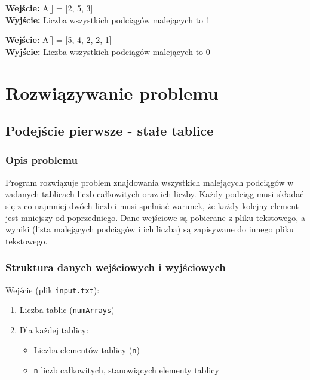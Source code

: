 \documentclass[a4paper,12pt]{article}
\begin{document}
\begin{flushleft}
\textbf{Wejście:} A[] = [2, 5, 3] \\
\textbf{Wyjście:} Liczba wszystkich podciągów malejących to 1 \\
\text{[5, 3]}
\end{flushleft}

\begin{flushleft}
\textbf{Wejście:} A[] = [5, 4, 2, 2, 1] \\
\textbf{Wyjście:} Liczba wszystkich podciągów malejących to 0
\end{flushleft}


\section{Rozwiązywanie problemu}
\subsection{Podejście pierwsze - stałe tablice}

\subsubsection{Opis problemu}

Program rozwiązuje problem znajdowania wszystkich malejących podciągów w zadanych tablicach liczb całkowitych oraz ich liczby. Każdy podciąg musi składać się z co najmniej dwóch liczb i musi spełniać warunek, że każdy kolejny element jest mniejszy od poprzedniego. Dane wejściowe są pobierane z pliku tekstowego, a wyniki (lista malejących podciągów i ich liczba) są zapisywane do innego pliku tekstowego.

\subsubsection{Struktura danych wejściowych i wyjściowych}

Wejście (plik \texttt{input.txt}):

\begin{flushleft}
\begin{enumerate}
	\item{Liczba tablic (\texttt{numArrays})}
	\item{Dla każdej tablicy: }
	\begin{itemize}
		\item{Liczba elementów tablicy (\texttt{n})}
		\item{\texttt{n} liczb całkowitych, stanowiących elementy tablicy}
	\end{itemize}
\end{enumerate}
\end{flushleft}
\end{document}

